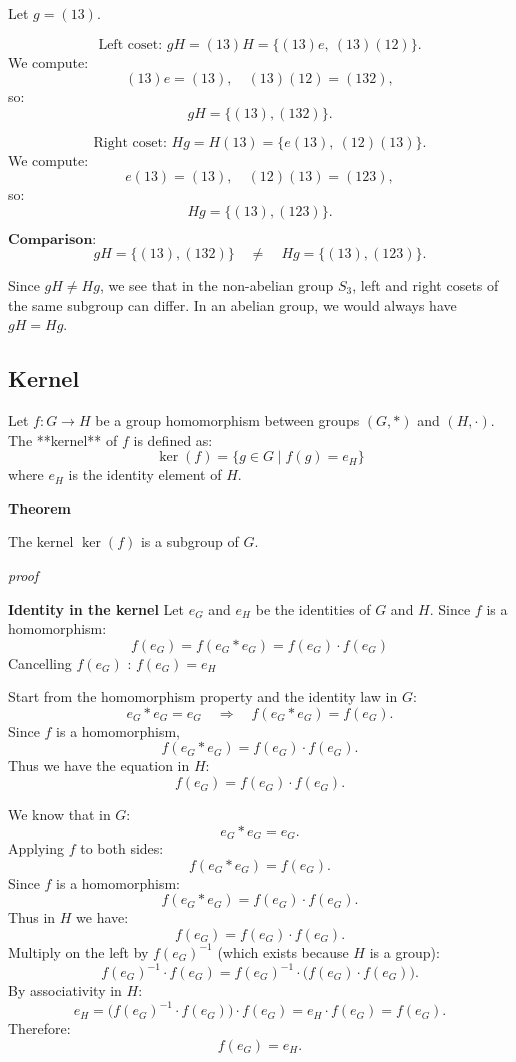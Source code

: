 \documentclass[12pt]{article}
\begin{document}
Let $g = (13)$.

$$
\text{Left coset: } gH = (13)H = \{ (13)e, \ (13)(12) \}.
$$
We compute:
$$
(13)e = (13), \quad (13)(12) = (132),
$$
so:
$$
gH = \{ (13), (132) \}.
$$


$$
\text{Right coset: } Hg = H(13) = \{ e(13), \ (12)(13) \}.
$$
We compute:
$$
e(13) = (13), \quad (12)(13) = (123),
$$
so:
$$
Hg = \{ (13), (123) \}.
$$

$\textbf{Comparison:}$  
$$
gH = \{ (13), (132) \} \quad \neq \quad Hg = \{ (13), (123) \}.
$$

Since $gH \neq Hg$, we see that in the non-abelian group $S_3$, left and right cosets of the same subgroup can differ.  
In an abelian group, we would always have $gH = Hg$.

\subsection*{Kernel}

Let $f: G \to H$ be a group homomorphism between groups $(G, *)$ and $(H, \cdot)$.  
The **kernel** of $f$ is defined as:
$$
\ker(f) = \{ g \in G \mid f(g) = e_H \}
$$
where $e_H$ is the identity element of $H$.

\textbf{Theorem}

The kernel $\ker(f)$ is a subgroup of $G$.


\textit{proof}

\textbf{Identity in the kernel} 
Let $e_G$ and $e_H$ be the identities of $G$ and $H$.  
Since $f$ is a homomorphism:
$$
f(e_G) = f(e_G * e_G) = f(e_G) \cdot f(e_G)
$$
Cancelling $f(e_G)$ : $f(e_G) = e_H$

Start from the homomorphism property and the identity law in \(G\):
$$
e_G * e_G = e_G \quad \Rightarrow \quad f(e_G * e_G) = f(e_G).
$$
Since \(f\) is a homomorphism,
$$
f(e_G * e_G) = f(e_G)\cdot f(e_G).
$$
Thus we have the equation in \(H\):
$$
f(e_G) = f(e_G)\cdot f(e_G).
$$

We know that in $G$:
$$
e_G * e_G = e_G.
$$
Applying $f$ to both sides:
$$
f(e_G * e_G) = f(e_G).
$$
Since $f$ is a homomorphism:
$$
f(e_G * e_G) = f(e_G) \cdot f(e_G).
$$
Thus in $H$ we have:
$$
f(e_G) = f(e_G) \cdot f(e_G).
$$
Multiply on the left by $f(e_G)^{-1}$ (which exists because $H$ is a group):
$$
f(e_G)^{-1} \cdot f(e_G) = f(e_G)^{-1} \cdot \big(f(e_G) \cdot f(e_G)\big).
$$
By associativity in $H$:
$$
e_H = \big(f(e_G)^{-1} \cdot f(e_G)\big) \cdot f(e_G) = e_H \cdot f(e_G) = f(e_G).
$$
Therefore:
$$
f(e_G) = e_H.
$$
\end{document}

